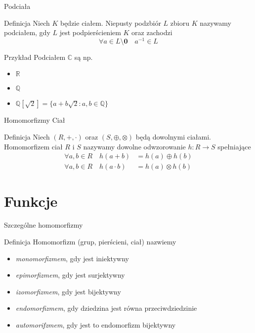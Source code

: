 \documentclass{beamer}
\newcommand{\zero}{\mathbf{0}}
\begin{document}
\begin{frame}{Podciała}
    \begin{block}{Definicja}
        Niech $K$ będzie ciałem. Niepusty podzbiór $L$ zbioru $K$ nazywamy podciałem, gdy $L$ jest podpierścieniem $K$ oraz zachodzi
        $$\forall a \in L\setminus{\zero} \quad a^{-1} \in L$$
    \end{block}
    \begin{exampleblock}{Przykład}
        Podciałem $\mathbb{C}$ są np.
        \begin{itemize}
            \item $\mathbb{R}$
            \item $\mathbb{Q}$
            \item $\mathbb{Q}[\sqrt{2}] = \{ a + b\sqrt{2} : a,b \in \mathbb{Q} \}$
        \end{itemize}
    \end{exampleblock}
\end{frame}

\begin{frame}{Homomorfizmy Ciał}
    \begin{block}{Definicja}
        Niech $(R, + , \cdot)$ oraz $(S, \oplus, \otimes)$ będą dowolnymi ciałami. Homomorfizem ciał $R$ i $S$ nazywamy dowolne odwzorowanie $h : R \rightarrow S$ spełniające 
        \begin{align*}
            \forall a,b \in R \quad h(a + b) & = h(a) \oplus h(b) \\
            \forall a,b \in R \quad h(a \cdot b) & = h(a) \otimes h(b) 
        \end{align*}
    \end{block}
\end{frame}
\section{Funkcje}

\begin{frame}{Szczególne homomorfizmy}
    \begin{block}{Definicja}
        Homomorfizm (grup, pierścieni, ciał) nazwiemy 
        \begin{itemize}
            \item \textit{monomorfizmem}, gdy jest iniektywny
            \item \textit{epimorfizmem}, gdy jest surjektywny
            \item \textit{izomorfizmem}, gdy jest bijektywny
            \item \textit{endomorfizmem}, gdy dziedzina jest równa przeciwdziedzinie
            \item \textit{automorifzmem}, gdy jest to endomorfizm bijektywny 
        \end{itemize}
    \end{block}
\end{frame}
\end{document}
